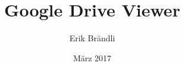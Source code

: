 \documentclass[a4paper,12pt]{book}
\begin{document}
\author{Erik Brändli}
\title{Google Drive Viewer \mars}
\date{März 2017}

\frontmatter
\maketitle
\tableofcontents

\mainmatter



\backmatter
\end{document}
